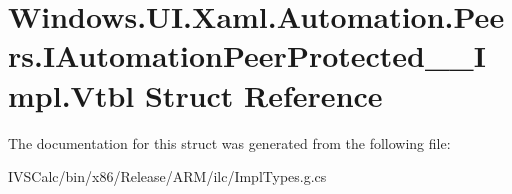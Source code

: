 \hypertarget{struct_windows_1_1_u_i_1_1_xaml_1_1_automation_1_1_peers_1_1_i_automation_peer_protected_____impl_1_1_vtbl}{}\section{Windows.\+U\+I.\+Xaml.\+Automation.\+Peers.\+I\+Automation\+Peer\+Protected\+\_\+\+\_\+\+Impl.\+Vtbl Struct Reference}
\label{struct_windows_1_1_u_i_1_1_xaml_1_1_automation_1_1_peers_1_1_i_automation_peer_protected_____impl_1_1_vtbl}


The documentation for this struct was generated from the following file\+:\begin{DoxyCompactItemize}
\item 
I\+V\+S\+Calc/bin/x86/\+Release/\+A\+R\+M/ilc/Impl\+Types.\+g.\+cs\end{DoxyCompactItemize}
